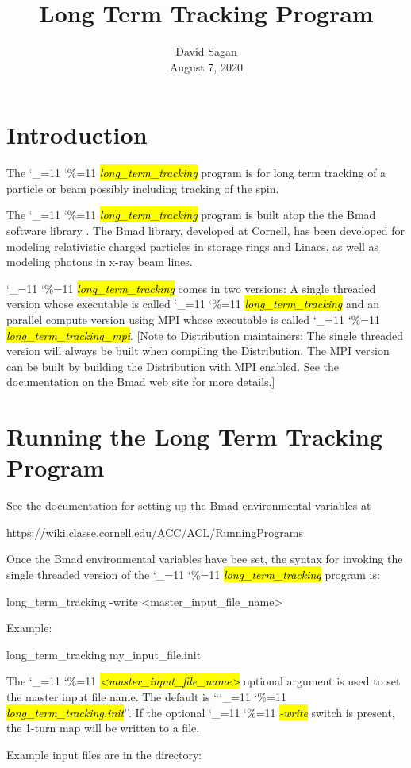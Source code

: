 \documentclass{hitec}
\title{Long Term Tracking Program}
\author{}
\date{David Sagan \\ August 7, 2020}
\newcommand\dottcmd[1]{\hl{\em#1}\endgroup}
\newcommand{\vn}{\begingroup\catcode`\_=11 \catcode`\%=11 \dottcmd}
\newcommand{\ltt}{\vn{long_term_tracking}\xspace}
\newcommand{\Section}[1]{\section{#1}\vspace*{-1ex}}
\begin{document}
\maketitle

\tableofcontents


\Section{Introduction} 

The \ltt program is for long term tracking of a particle or beam possibly
including tracking of the spin.

The \ltt program is built atop the the Bmad software library \cite{b:bmad}. The Bmad library,
developed at Cornell, has been developed for modeling relativistic charged particles in storage
rings and Linacs, as well as modeling photons in x-ray beam lines.

\ltt comes in two versions: A single threaded version whose executable is called
\vn{long_term_tracking} and an parallel compute version using MPI whose executable is called
\vn{long_term_tracking_mpi}. [Note to Distribution maintainers: The single threaded version will
always be built when compiling the Distribution. The MPI version can be built by building the
Distribution with MPI enabled. See the documentation on the Bmad web site for more details.]

\Section{Running the Long Term Tracking Program} 
\label{s:run}

See the documentation for setting up the Bmad environmental variables at
\begin{code}
  https://wiki.classe.cornell.edu/ACC/ACL/RunningPrograms
\end{code}

Once the Bmad environmental variables have bee set, the syntax for invoking the single threaded
version of the \ltt program is:
\begin{code}
  long_term_tracking {-write} {<master_input_file_name>}
\end{code}
Example:
\begin{code}
  long_term_tracking my_input_file.init
\end{code}
The \vn{<master_input_file_name>} optional argument is used to set the master input file name. The
default is ``\vn{long_term_tracking.init}''. If the optional \vn{-write} switch is present, the
1-turn map will be written to a file.

Example input files are in the directory:
\end{document}

